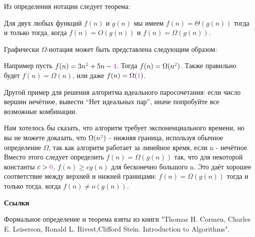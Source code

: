 \vspace{\baselineskip}

Из определения нотации следует теорема:

\vspace{\baselineskip}

Для двух любых функций $f(n)$ и $g(n)$ мы имеем $f(n) = \Theta(g(n))$ тогда и только тогда, когда $f(n)= O(g(n))$ и $f(n)=\Omega(g(n))$.

\vspace{\baselineskip}

Графически $\Omega$-нотация может быть представлена следующим образом:


\vspace{\baselineskip}

Например пусть $f(n) = 3n^{\textcolor{Purple}{2}} + 5n - \textcolor{Purple}{4}$. Тогда $f(n) = \Omega(n^{\textcolor{Purple}{2}})$. Также правильно будет $f(n) = \Omega(n)$, или даже $f(n) = \Omega(\textcolor{Purple}{1})$.

\vspace{\baselineskip}

Другой пример для решения алгоритма идеального паросочетания: если число вершин нечётное, вывести “Нет идеальных пар”, иначе попробуйте все возможные комбинации.

\vspace{\baselineskip}

Нам хотелось бы сказать, что алгоритм требует экспоненциального времени, но вы не можете доказать, что $\Omega(n^{\textcolor{Purple}{2}})$ - нижняя граница, используя обычное определение $\Omega$, так как алгоритм работает за линейное время, если n - нечётное. Вместо этого следует определить $f(n)=\Omega(g(n))$ так, что для некоторой константы $c>\textcolor{Purple}{0}$, $f(n) \geqslant c g(n)$ для бесконечно большого n. Это даёт хорошее соответствие между верхней и нижней границами: $f(n)=\Omega(g(n))$ тогда и только тогда, когда $f(n) \neq o(g(n))$.

\vspace{\baselineskip}

\textbf{Ссылки}

\vspace{\baselineskip}

Формальное определение и теорема взяты из книги "Thomas H. Cormen, Charles E. Leiserson, Ronald L. Rivest,Clifford Stein. Introduction to Algorithms".